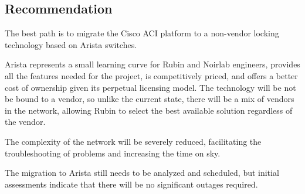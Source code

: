 \subsection{Recommendation}

The best path is to migrate the Cisco ACI platform to a non-vendor locking technology based on Arista switches. 

Arista represents a small learning curve for Rubin and Noirlab engineers, provides all the features needed for the project, is competitively priced, and offers a better cost of ownership given its perpetual licensing model. 
The technology will be not be bound to a vendor, so unlike the current state, there will be a mix of vendors in the network, allowing Rubin to select the best available solution regardless of the vendor. 

The complexity of the network will be severely reduced, facilitating the troubleshooting of problems and increasing the time on sky.

The migration to Arista still needs to be analyzed and scheduled, but initial assessments indicate that there will be no significant outages required.